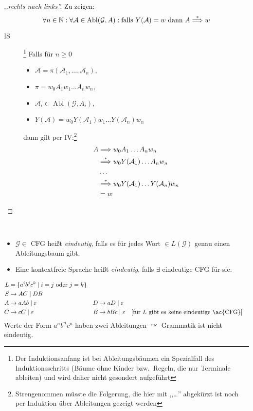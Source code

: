 \begin{proof}[,,rechts nach links'']
  Zu zeigen:
  \begin{displaymath}
    \forall n \in \N: \forall \mathcal{A} \in \operatorname{Abl}(\mathcal{G}, A): \text{falls } Y(\mathcal{A}) = w \text{ dann } A \stackrel{*}{\==>} w
  \end{displaymath}
  \begin{description}
  \item[IS]
\footnote{ Der Induktionsanfang ist bei Ableitungsbäumen ein Spezialfall des Induktionsschritts (Bäume ohne Kinder bzw.\ Regeln, die nur Terminale ableiten) und wird daher nicht gesondert aufgeführt }
    Falls für $n \ge 0$
    \begin{itemize}
    \item  $\mathcal{A} = \pi(\mathcal{A}_1, \ldots, \mathcal{A}_n)$,
    \item $\pi = w_0A_1w_1\ldots A_nw_n$,
    \item $\mathcal{A}_i \in \operatorname{Abl}(\mathcal{G}, A_i)$,
    \item $Y(\mathcal{A}) = w_0Y(\mathcal{A}_1)w_1\ldots Y(\mathcal{A}_n)w_n$
    \end{itemize}
    dann gilt per IV:\footnote{Strengenommen müsste die Folgerung, die hier mit ,,\ldots'' abgekürzt ist noch per Induktion über Ableitungen gezeigt werden} 
    \begin{align*}
      A &\==> w_0A_1\ldots A_nw_n \\
        &\stackrel{*}{\==>} w_0Y(\mathcal{A}_1)\ldots A_nw_n \\
        & \dots \\
        & \stackrel{*}{\==>} w_0Y(\mathcal{A}_1)\ldots Y(\mathcal{A}_n)w_n \\
        &= w
    \end{align*}
  \end{description}
  
\end{proof}

\begin{Def}[name={[Eindeutigkeit von \acs*{CFG} und \acs*{CFL}]}]\
	\begin{itemize}
	\item $\mathcal{G}\in$ \ac{CFG} heißt \emph{eindeutig}, falls es für jedes Wort $\in L(\mathcal{G})$ genau einen Ableitungsbaum gibt.
	\item Eine kontextfreie Sprache heißt \emph{eindeutig}, falls $\exists$ eindeutige \ac{CFG} für sie.
	\end{itemize}
\end{Def}
\begin{Bsp}
	\begin{align*}
		L &= \{ a^ib^jc^k \mid i=j\text{ oder }j=k \}\\
		S &\-> AC \mid DB\\
		A &\-> aAb \mid \Eps & D &\->aD \mid \Eps\\
		C &\->cC \mid \Eps & B &\-> bBc \mid \Eps \quad[\text{für $L$ gibt es keine eindeutige \ac{CFG}}]
	\end{align*}
	Werte der Form $a^nb^nc^n$ haben zwei Ableitungen $\curvearrowright$ Grammatik ist nicht eindeutig.
\end{Bsp}

